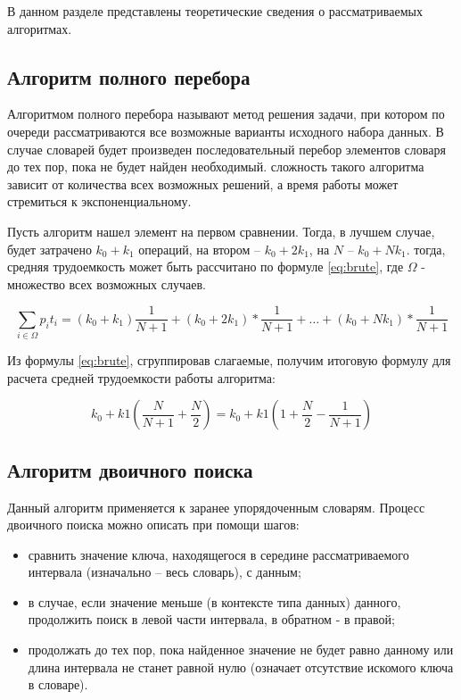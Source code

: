 В данном разделе представлены теоретические сведения о рассматриваемых алгоритмах.

\subsection{Алгоритм полного перебора}

Алгоритмом полного перебора называют метод решения задачи, при котором по очереди рассматриваются все возможные варианты исходного набора данных. В случае словарей будет произведен последовательный перебор элементов словаря до тех пор, пока не будет найден необходимый. сложность такого алгоритма зависит от количества всех возможных решений, а время работы может стремиться к экспоненциальному.

Пусть алгоритм нашел элемент на первом сравнении. Тогда, в лучшем случае, будет затрачено $k_0 + k_1$ операций, на втором -- $k_0 + 2k_1$, на $N$ -- $k_0 + Nk_1$. тогда, средняя трудоемкость может быть рассчитано по формуле \eqref{eq:brute}, где $\Omega$ - множество всех возможных случаев.

\begin{equation}
   \label{eq:brute}
   \sum_{i \in \Omega} p_i t_i = (k_0 + k_1) \frac{1}{N + 1} + (k_0 + 2k_1) * \frac{1}{N + 1} + \dots + (k_0 + Nk_1) * \frac{1}{N + 1} 
\end{equation}

Из формулы \eqref{eq:brute}, сгруппировав слагаемые, получим итоговую формулу для расчета средней трудоемкости работы алгоритма:

\begin{equation}
   k_0 + k1(\frac{N}{N + 1} + \frac{N}{2}) = k_0 + k1(1 + \frac{N}{2} - \frac{1}{N + 1}) 
\end{equation}

\subsection{Алгоритм двоичного поиска}

Данный алгоритм применяется к заранее упорядоченным словарям. Процесс двоичного поиска можно описать при помощи шагов:
\begin{itemize}
    \item сравнить значение ключа, находящегося в середине рассматриваемого интервала (изначально -- весь словарь), с данным;
    \item в случае, если значение меньше (в контексте типа данных) данного, продолжить поиск в левой части интервала, в обратном - в правой;
    \item продолжать до тех пор, пока найденное значение не будет равно данному или длина интервала не станет равной нулю (означает отсутствие искомого ключа в словаре).
\end{itemize}

